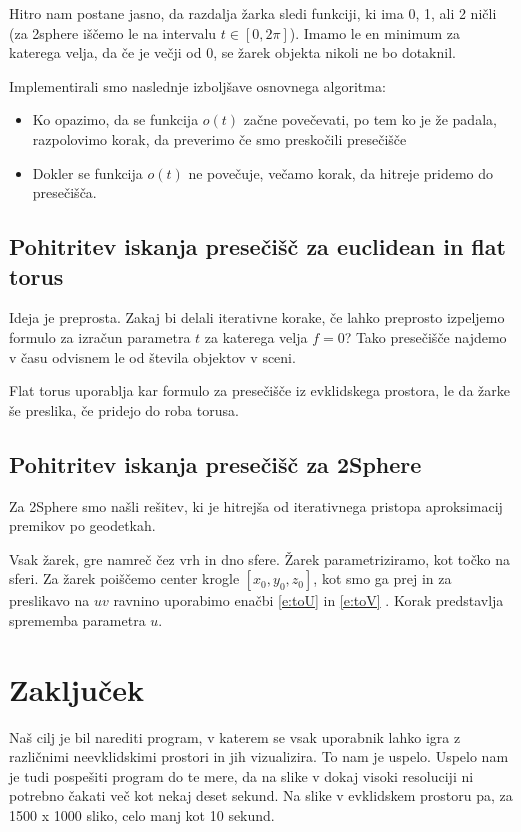 \documentclass[titlepage]{article}
\begin{document}
Hitro nam postane jasno, da razdalja žarka sledi funkciji, ki ima 0, 1, ali 2 ničli (za 2sphere iščemo le na intervalu \(t \in [0, 2\pi] \)). 
Imamo le en minimum za katerega velja, da če je večji od 0, se žarek objekta nikoli ne bo dotaknil.

Implementirali smo naslednje izboljšave osnovnega algoritma:
\begin{itemize}
  \item Ko opazimo, da se funkcija \( o(t) \) začne povečevati, po tem ko je že padala, 
  razpolovimo korak, da preverimo če smo preskočili presečišče
  \item Dokler se funkcija \( o(t) \) ne povečuje, večamo korak, da hitreje pridemo do presečišča.
\end{itemize}

\subsection{Pohitritev iskanja presečišč za euclidean in flat torus}

Ideja je preprosta. Zakaj bi delali iterativne korake, če lahko preprosto izpeljemo 
formulo za izračun parametra \( t \) za katerega velja \( f = 0 \)? Tako presečišče 
najdemo v času odvisnem le od števila objektov v sceni.

Flat torus uporablja kar formulo za presečišče iz evklidskega prostora, le da žarke še preslika, če pridejo do roba torusa.

\subsection{Pohitritev iskanja presečišč za 2Sphere}

Za 2Sphere smo našli rešitev, ki je hitrejša od iterativnega pristopa aproksimacij premikov po geodetkah.

Vsak žarek, gre namreč čez vrh in dno sfere. Žarek parametriziramo, kot točko na sferi. Za žarek poiščemo center krogle \( [x_0, y_0, z_0] \), kot smo ga prej in za preslikavo na $uv$ ravnino uporabimo enačbi \ref{e:toU} in \ref{e:toV}
. Korak predstavlja sprememba parametra $u$.

\section{Zaključek}
Naš cilj je bil narediti program, v katerem se vsak uporabnik lahko igra z različnimi neevklidskimi
prostori in jih vizualizira. To nam je uspelo. Uspelo nam je tudi pospešiti program do te mere, da 
na slike v dokaj visoki resoluciji ni potrebno čakati več kot nekaj deset sekund. Na slike v evklidskem 
prostoru pa, za 1500 x 1000 sliko, celo manj kot 10 sekund.
\end{document}
